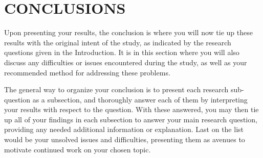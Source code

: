 \chapter{CONCLUSIONS}
Upon presenting your results, the conclusion is where you will now tie up these results with the original intent of the study, as indicated by the research questions given in the Introduction. It is in this section where you will also discuss any difficulties or issues encountered during the study, as well as your recommended method for addressing these problems.

The general way to organize your conclusion is to present each research sub-question as a subsection, and thoroughly answer each of them by interpreting your results with respect to the question. With these answered, you may then tie up all of your findings in each subsection to answer your main research question, providing any needed additional information or explanation. Last on the list would be your unsolved issues and difficulties, presenting them as avenues to motivate continued work on your chosen topic.
